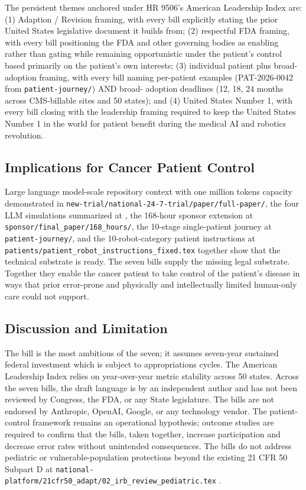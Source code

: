 \hspace{0.5cm} The persistent themes anchored under HR 9506's American Leadership
Index are: (1) Adaption / Revision framing, with every bill
explicitly stating the prior United States legislative document it
builds from; (2) respectful FDA framing, with every bill positioning
the FDA and other governing bodies as enabling rather than gating
while remaining opportunistic under the patient's control based
primarily on the patient's own interests; (3) individual patient
plus broad-adoption framing, with every bill naming per-patient
examples (PAT-2026-0042 from \texttt{patient-journey/}) AND broad-
adoption deadlines (12, 18, 24 months across CMS-billable sites and
50 states); and (4) United States Number 1, with every bill closing
with the leadership framing required to keep the United States
Number 1 in the world for patient benefit during the medical AI and
robotics revolution.

\subsection{Implications for Cancer Patient Control}

\hspace{0.5cm} Large language model-scale repository context with one million tokens capacity demonstrated in
\texttt{new-trial/national-24-7-trial/paper/full-paper/}, the four
LLM simulations summarized at \cite{kawchak_2026_19994945}, the
168-hour sponsor extension at \texttt{sponsor/final\_paper/168\_hours/},
the 10-stage single-patient journey at \texttt{patient-journey/},
and the 10-robot-category patient instructions at
\texttt{patients/patient\_robot\_instructions\_fixed.tex} together
show that the technical substrate is ready. The seven bills supply
the missing legal substrate. Together they enable the cancer
patient to take control of the patient's disease in ways that
prior error-prone and physically and intellectually limited human-only care could not support.

\subsection{Discussion and Limitation}

\hspace{0.5cm} The bill is the most ambitious of the seven; it assumes seven-year
sustained federal investment which is subject to appropriations
cycles. The American Leadership Index relies on year-over-year
metric stability across 50 states. Across the seven bills, the
draft language is by an independent author and has not been
reviewed by Congress, the FDA, or any State legislature. The bills
are not endorsed by Anthropic, OpenAI, Google, or any technology
vendor. The patient-control framework remains an operational
hypothesis; outcome studies are required to confirm that the
bills, taken together, increase participation and decrease error
rates without unintended consequences. The bills do not address
pediatric or vulnerable-population protections beyond the existing
21 CFR 50 Subpart D at
\texttt{national-platform/21cfr50\_adapt/02\_irb\_review\_pediatric.tex}
\cite{rank4_fdora_fda_modernization_2022, kawchak_2026_19040707}.

